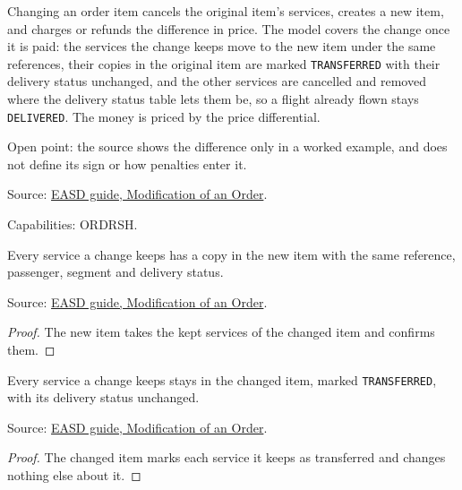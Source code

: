 \begin{definition}
  \label{def:c18-change}
  Changing an order item cancels the original item's services, creates a new
  item, and charges or refunds the difference in price.  The model covers the
  change once it is paid: the services the change keeps move to the new item
  under the same references, their copies in the original item are marked
  \texttt{TRANSFERRED} with their delivery status unchanged, and the other
  services are cancelled and removed where the delivery status table lets
  them be, so a flight already flown stays \texttt{DELIVERED}.  The money is
  priced by the price differential.

  Open point: the source shows the difference only in a worked example, and
  does not define its sign or how penalties enter it.

  Source: \href{https://standards.atlassian.net/wiki/spaces/EASD/pages/574619782/Modification+of+an+Order}{EASD guide, Modification of an Order}.

  Capabilities: ORDRSH.
\end{definition}

\begin{theorem}
  \label{thm:change-cancellation-kept-references}
  Every service a change keeps has a copy in the new item with the same
  reference, passenger, segment and delivery status.

  Source: \href{https://standards.atlassian.net/wiki/spaces/EASD/pages/574619782/Modification+of+an+Order}{EASD guide, Modification of an Order}.
\end{theorem}
\begin{proof}
  The new item takes the kept services of the changed item and confirms them.
\end{proof}

\begin{theorem}
  \label{thm:change-cancellation-originals-transferred}
  Every service a change keeps stays in the changed item, marked
  \texttt{TRANSFERRED}, with its delivery status unchanged.

  Source: \href{https://standards.atlassian.net/wiki/spaces/EASD/pages/574619782/Modification+of+an+Order}{EASD guide, Modification of an Order}.
\end{theorem}
\begin{proof}
  The changed item marks each service it keeps as transferred and changes
  nothing else about it.
\end{proof}

